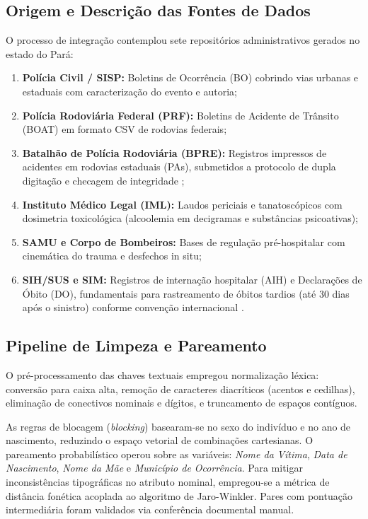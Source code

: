 \documentclass[sigconf, nonacm, screen, language=portuguese, language=spanish, language={main=english}]{acmart}
\begin{document}
\subsection{Origem e Descrição das Fontes de Dados}
O processo de integração contemplou sete repositórios administrativos gerados no estado do Pará:
\begin{enumerate}
    \item \textbf{Polícia Civil / SISP:} Boletins de Ocorrência (BO) cobrindo vias urbanas e estaduais com caracterização do evento e autoria;
    \item \textbf{Polícia Rodoviária Federal (PRF):} Boletins de Acidente de Trânsito (BOAT) em formato CSV de rodovias federais;
    \item \textbf{Batalhão de Polícia Rodoviária (BPRE):} Registros impressos de acidentes em rodovias estaduais (PAs), submetidos a protocolo de dupla digitação e checagem de integridade \cite{rahm2000};
    \item \textbf{Instituto Médico Legal (IML):} Laudos periciais e tanatoscópicos com dosimetria toxicológica (alcoolemia em decigramas e substâncias psicoativas);
    \item \textbf{SAMU e Corpo de Bombeiros:} Bases de regulação pré-hospitalar com cinemática do trauma e desfechos in situ;
    \item \textbf{SIH/SUS e SIM:} Registros de internação hospitalar (AIH) e Declarações de Óbito (DO), fundamentais para rastreamento de óbitos tardios (até 30 dias após o sinistro) conforme convenção internacional \cite{who2018}.
\end{enumerate}

\subsection{Pipeline de Limpeza e Pareamento}
O pré-processamento das chaves textuais empregou normalização léxica: conversão para caixa alta, remoção de caracteres diacríticos (acentos e cedilhas), eliminação de conectivos nominais e dígitos, e truncamento de espaços contíguos. 

As regras de blocagem (\textit{blocking}) basearam-se no sexo do indivíduo e no ano de nascimento, reduzindo o espaço vetorial de combinações cartesianas. O pareamento probabilístico operou sobre as variáveis: \textit{Nome da Vítima}, \textit{Data de Nascimento}, \textit{Nome da Mãe} e \textit{Município de Ocorrência}. Para mitigar inconsistências tipográficas no atributo nominal, empregou-se a métrica de distância fonética acoplada ao algoritmo de Jaro-Winkler. Pares com pontuação intermediária foram validados via conferência documental manual.
\end{document}
